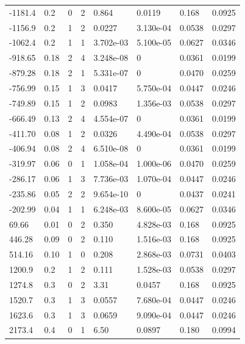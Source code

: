 \documentclass[preview]{standalone}
\begin{document}
{{\begin{tabular}{L{1.2cm}C{1.2cm} C{0.3cm}C{0.5cm} C{1.4cm}C{1.4cm} C{1.4cm}C{1.4cm}}
  -1181.4  &   0.2  & 0     &  2 &  0.864  & 0.0119  & 0.168 &  0.0925   \\ 
  -1156.9  &   0.2  & 1     &  2 &  0.0227  & 3.130e-04  & 0.0538 &  0.0297   \\ 
  -1062.4  &   0.2  & 1     &  1 &  3.702e-03  & 5.100e-05  & 0.0627 &  0.0346   \\ 
  -918.65  &  0.18  & 2     &  4 &  3.248e-08  & 0  & 0.0361 &  0.0199   \\ 
  -879.28  &  0.18  & 2     &  1 &  5.331e-07  & 0  & 0.0470 &  0.0259   \\ 
  -756.99  &  0.15  & 1     &  3 &  0.0417  & 5.750e-04  & 0.0447 &  0.0246   \\ 
  -749.89  &  0.15  & 1     &  2 &  0.0983  & 1.356e-03  & 0.0538 &  0.0297   \\ 
  -666.49  &  0.13  & 2     &  4 &  4.554e-07  & 0  & 0.0361 &  0.0199   \\ 
  -411.70  &  0.08  & 1     &  2 &  0.0326  & 4.490e-04  & 0.0538 &  0.0297   \\ 
  -406.94  &  0.08  & 2     &  4 &  6.510e-08  & 0  & 0.0361 &  0.0199   \\ 
  -319.97  &  0.06  & 0     &  1 &  1.058e-04  & 1.000e-06  & 0.0470 &  0.0259   \\ 
  -286.17  &  0.06  & 1     &  3 &  7.736e-03  & 1.070e-04  & 0.0447 &  0.0246   \\ 
  -235.86  &  0.05  & 2     &  2 &  9.654e-10  & 0  & 0.0437 &  0.0241   \\ 
  -202.99  &  0.04  & 1     &  1 &  6.248e-03  & 8.600e-05  & 0.0627 &  0.0346   \\ 
  69.66  &  0.01  & 0     &  2 &  0.350  & 4.828e-03  & 0.168 &  0.0925   \\ 
  446.28  &  0.09  & 0     &  2 &  0.110  & 1.516e-03  & 0.168 &  0.0925   \\ 
  514.16  &  0.10  & 1     &  0 &  0.208  & 2.868e-03  & 0.0731 &  0.0403   \\ 
  1200.9  &   0.2  & 1     &  2 &  0.111  & 1.528e-03  & 0.0538 &  0.0297   \\ 
  1274.8  &   0.3  & 0     &  2 &  3.31  & 0.0457  & 0.168 &  0.0925   \\ 
  1520.7  &   0.3  & 1     &  3 &  0.0557  & 7.680e-04  & 0.0447 &  0.0246   \\ 
  1623.6  &   0.3  & 1     &  3 &  0.0659  & 9.090e-04  & 0.0447 &  0.0246   \\ 
  2173.4  &   0.4  & 0     &  1 &  6.50  & 0.0897  & 0.180 &  0.0994   \\ 

\end{tabular}}}
\end{document}
